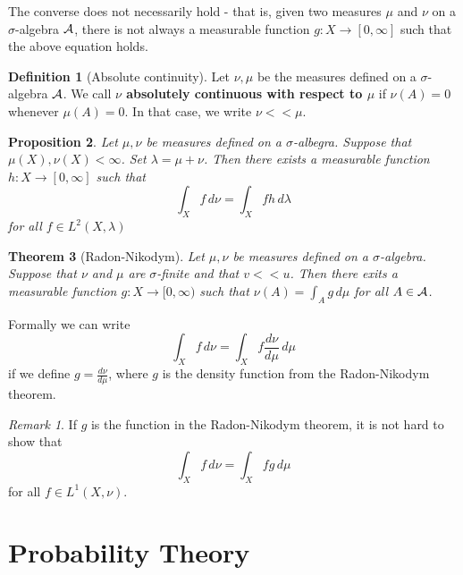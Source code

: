 \documentclass[10pt, oneside, reqno]{amsart}
\theoremstyle{plain}%
\newtheorem{thm}{Theorem}[section]
\newtheorem{prop}[thm]{Proposition}
\theoremstyle{definition}
\newtheorem{defn}[thm]{Definition}
\theoremstyle{remark}
\newtheorem*{rem}{Remark}
\newcommand{\dmu}{\, d \mu}
\begin{document}
The converse does not necessarily hold - that is, given two measures $\mu$ and $\nu$ on a $\sigma$-algebra $\mathcal{A}$, there is not always a measurable function $g : X \rightarrow [0,\infty]$ such that the above equation holds.

\begin{defn}[Absolute continuity]
	Let $\nu, \mu$ be the measures defined on a $\sigma$-algebra $\mathcal{A}$. We call \textbf{$\nu$ absolutely continuous with respect to $\mu$} if $\nu(A) = 0$ whenever $\mu(A) = 0$.  In that case, we write $\nu << \mu$.
\end{defn}

\begin{prop}
	Let $\mu, \nu$ be measures defined on a $\sigma$-albegra.  Suppose that $\mu(X), \nu(X) < \infty$.  Set $\lambda = \mu + \nu$.  Then there exists a measurable function $h : X \rightarrow [0,\infty] $ such that \[
		\int_X f \, d \nu = \int_X f h \, d \lambda
	\] for all $f \in L^2(X, \lambda)$
\end{prop}

\begin{thm}[Radon-Nikodym]
	Let $\mu,\nu$ be measures defined on a $\sigma$-algebra.  Suppose that $\nu$ and $\mu$ are $\sigma$-finite and that $v << u$.  Then there exits a measurable function $g : X \rightarrow [0,\infty)$ such that $\nu(A) = \int_A g \dmu$ for all $A \in \mathcal{A}$. 
\end{thm}

Formally we can write \[
	\int_X f \, d \nu = \int_X f \frac{d \nu}{d\mu} \dmu
\] if we define $g = \frac{d \nu}{d\mu}$, where $g$ is the density function from the Radon-Nikodym theorem.

\begin{rem}
	If $g$ is the function in the Radon-Nikodym theorem, it is not hard to show that \[
		\int_X f \, d \nu = \int_X f g \dmu
	\] for all $f \in L^1(X, \nu)$.
\end{rem}















\section{Probability Theory} %
\label{sec:probability_theory}
\end{document}
